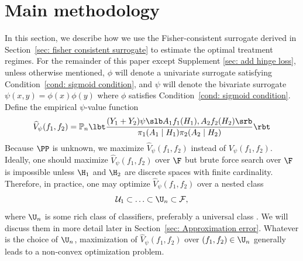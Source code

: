 \documentclass[preprint] {imsart}
\begin{document}
\section{Main methodology}
\label{sec: main methodology}
In this section, we describe how we use the Fisher-consistent surrogate derived in Section~\ref{sec: fisher consistent surrogate} to estimate the optimal treatment regimes. For the remainder of this paper except Supplement \ref{sec: add hinge loss}, unless otherwise mentioned, $\phi$ will denote a univariate surrogate satisfying Condition~\ref{cond: sigmoid condition}, and $\psi$ will denote the bivariate surrogate $\psi(x,y)=\phi(x)\phi(y)$ where $\phi$ satisfies Condition~\ref{cond: sigmoid condition}.
Define the empirical    $\psi$-value function
\begin{equation}\label{def: value function sample estimate}
\widehat V_{\psi}(f_1,f_2)=\mathbb P_n \lbt\dfrac{(Y_1+Y_2)\psi\slb A_1 f_1(H_1), A_2f_2(H_2)\srb}{\pi_1(A_1\mid H_1)\pi_2(A_2\mid H_2)} \rbt
\end{equation}
Because $\PP$ is unknown, we maximize $\widehat V_{\psi}(f_1,f_2)$
instead of $V_\psi(f_1,f_2)$. Ideally, one should maximize $\widehat V_{\psi}(f_1,f_2)$ over $\F$ but  brute force search over $\F$ is impossible unless $\H_1$ and $\H_2$ are discrete spaces with finite cardinality. Therefore, in practice, one may 
 optimize $\widehat V_\psi(f_1,f_2)$ over a nested  class 
 \[\mathcal U_1\subset\ldots\subset \mathcal \U_n\subset \mathcal F,\]
where $\U_n$ is some rich class of classifiers, preferably a universal class \citep[see][]{zhang2018}. We will discuss  them in more detail later in Section~\ref{sec: Approximation error}. Whatever is the choice of $\U_n$,  maximization of $\widehat V_\psi(f_1,f_2)$ over $(f_1,f_2)\in\U_n$ generally leads to a non-convex optimization problem. 

\end{document}
